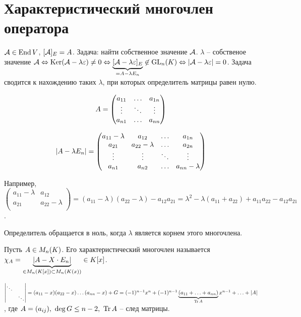 \documentclass[main]{subfiles}
\begin{document}
\chapter{Характеристический многочлен оператора}

$\mathcal{A} \in \operatorname{End} V$, $[\mathcal{A}]_E = A$.
Задача: найти собственное значение $\mathcal{A}$.
$\lambda$ -- собственое значение $\mathcal{A} \Leftrightarrow
    \operatorname{Ker}(\mathcal{A} - \lambda\varepsilon) \neq 0 \Leftrightarrow
    \underbrace{[\mathcal{A} - \lambda\varepsilon]_E}_{=A-\lambda E_n} \not\in \operatorname{GL}_n(K) \Leftrightarrow |\mathcal{A} - \lambda\varepsilon| = 0$. Задача сводится к нахождению таких
$\lambda$, при которых определитель матрицы равен нулю.


\[A = \begin{pmatrix}
        a_{11} & \ldots & a_{1n} \\
        \vdots & \ddots & \vdots \\
        a_{n1} & \ldots & a_{nn} \\
    \end{pmatrix}\]

\[|A - \lambda E_n| = \begin{pmatrix}
        a_{11} - \lambda & a_{12}           & \ldots & a_{1n}           \\
        a_{21}           & a_{22} - \lambda & \ldots & a_{2n}           \\
        \vdots           & \vdots           & \ddots & \vdots           \\
        a_{n1}           & a_{n2}           & \ldots & a_{nn} - \lambda \\
    \end{pmatrix}\]


Например, $\begin{pmatrix}
        a_{11} - \lambda & a_{12}           \\
        a_{21}           & a_{22} - \lambda \\
    \end{pmatrix} = (a_{11} - \lambda)(a_{22} - \lambda) - a_{12} a_{21} =
    \lambda ^2 - \lambda(a_{11}+a_{22}) + a_{11}a_{22} - a_{12} a_{21}$.

Определитель обращается в ноль, когда $\lambda$
является корнем этого многочлена.

\begin{definition} 
    Пусть $A \in M_n(K)$. Его характеристический многочлен называется
    $\chi_A = \underbrace{|A - X\cdot E_n|}_{\in M_n(K[x])\subset M_n(K(x))} \in K[x]$.

    $\begin{vmatrix}
            \ddots &        \\
                   & \ddots \\
        \end{vmatrix} = (a_{11} - x)(a_{22} - x)\ldots(a_{nn} - x) + G =
        (-1)^{n-1}x^n+(-1)^{n-1}\underbrace{(a_{11}+\ldots+a_{nn})}_{\operatorname{Tr}A}x^{n-1}+\ldots+|A|$,
    где $\A= (a_{ij}),\ \deg G \leq n-2,\ \Tr\A$ -- след матрицы.
\end{definition}
\end{document}
